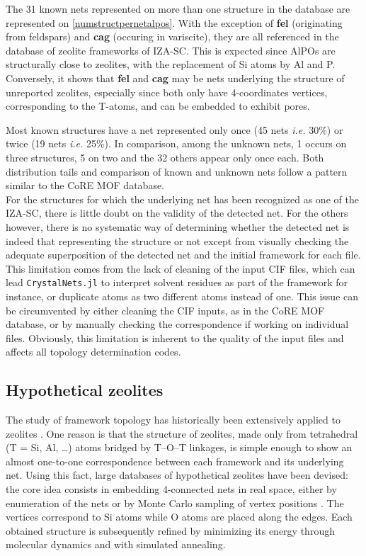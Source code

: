 \documentclass[main.tex]{subfiles}
\begin{document}
The 31 known nets represented on more than one structure in the database are represented on \cref{numstructpernetalpos}. With the exception of \textbf{fel} (originating from feldspars) and \textbf{cag} (occuring in variscite), they are all referenced in the database of zeolite frameworks of IZA-SC. This is expected since AlPOs are structurally close to zeolites, with the replacement of Si atoms by Al and P. Conversely, it shows that \textbf{fel} and \textbf{cag} may be nets underlying the structure of unreported zeolites, especially since both only have 4-coordinates vertices, corresponding to the T-atoms, and can be embedded to exhibit pores.

Most known structures have a net represented only once (45 nets \textit{i.e.} {30\%}) or twice (19 nets \textit{i.e.} {25\%}). In comparison, among the unknown nets, 1 occurs on three structures, 5 on two and the 32 others appear only once each. Both distribution tails and comparison of known and unknown nets follow a pattern similar to the CoRE MOF database.\\

For the structures for which the underlying net has been recognized as one of the IZA-SC, there is little doubt on the validity of the detected net. For the others however, there is no systematic way of determining whether the detected net is indeed that representing the structure or not except from visually checking the adequate superposition of the detected net and the initial framework for each file. This limitation comes from the lack of cleaning of the input CIF files, which can lead \texttt{CrystalNets.jl} to interpret solvent residues as part of the framework for instance, or duplicate atoms as two different atoms instead of one. This issue can be circumvented by either cleaning the CIF inputs, as in the CoRE MOF database, or by manually checking the correspondence if working on individual files. Obviously, this limitation is inherent to the quality of the input files and affects all topology determination codes.

\subsection{Hypothetical zeolites}


The study of framework topology has historically been extensively applied to zeolites \autocite{TopochemistryZeolites}. One reason is that the structure of zeolites, made only from tetrahedral (T = Si, Al, \ldots) atoms bridged by T--O--T linkages, is simple enough to show an almost one-to-one correspondence between each framework and its underlying net. Using this fact, large databases of hypothetical zeolites have been devised: the core idea consists in embedding 4-connected nets in real space, either by enumeration of the nets \autocite{Treacy} or by Monte Carlo sampling of vertex positions \autocite{Deem}. The vertices correspond to Si atoms while O atoms are placed along the edges. Each obtained structure is subsequently refined by minimizing its energy through molecular dynamics and with simulated annealing.
\end{document}
